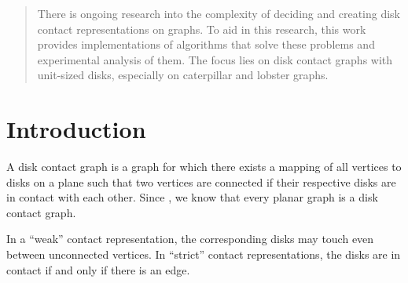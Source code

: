 \documentclass[draft,final]{vutinfth} %
\begin{document}
\frontmatter %

\addstatementpage




\begin{abstract}
There is ongoing research into the complexity of deciding and creating disk contact representations on graphs.
To aid in this research, this work provides implementations of algorithms that solve these problems and experimental analysis of them.
The focus lies on disk contact graphs with unit-sized disks, especially on caterpillar and lobster graphs.
\end{abstract}


\tableofcontents %

\mainmatter

\chapter{Introduction}

A disk contact graph is a graph for which there exists a mapping of all vertices to disks on a plane such that two vertices are connected if their respective disks are in contact with each other.
Since \cite{Koebe1936}, we know that every planar graph is a disk contact graph.

In a “weak” contact representation, the corresponding disks may touch even between unconnected vertices.
In “strict” contact representations, the disks are in contact if and only if there is an edge.
\end{document}

